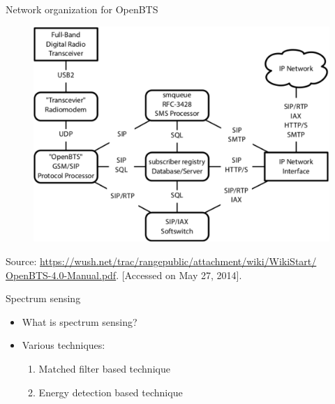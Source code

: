 \documentclass{beamer}
\begin{document}
  \begin{frame}{Network organization for OpenBTS}
    \begin{minipage}[t][0.8\textheight][t]{\textwidth}
      \begin{figure}
	\centering
	\includegraphics[width=0.8\linewidth]{img/btsSimple}
      \end{figure}
      \vfill
      \tiny{Source: \url{https://wush.net/trac/rangepublic/attachment/wiki/WikiStart/
OpenBTS-4.0-Manual.pdf}. [Accessed on May 27, 2014].}
   \end{minipage}
  \end{frame}
  
  \begin{frame}{Spectrum sensing}
    \begin{itemize}
      \item What is spectrum sensing?
      \item Various techniques:
      \begin{enumerate}
        \item Matched filter based technique
        \item Energy detection based technique
      \end{enumerate}
    \end{itemize}
  \end{frame}
\end{document}
